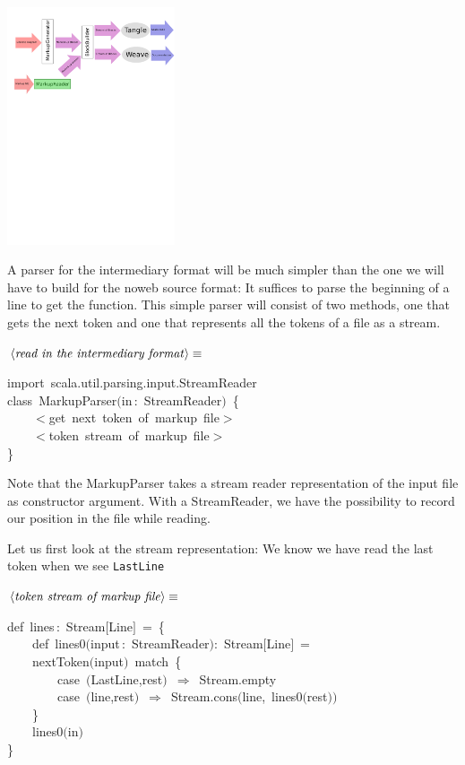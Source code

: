 \documentclass[a4paper,12pt]{article}
\begin{document}
\includegraphics[viewport=0 500 264 800,clip,height=7cm]{images/markupReader.pdf}

A parser for the intermediary format will be much simpler than the one
we will have to build for the noweb source format: It suffices to parse
the beginning of a line to get the function. This simple parser will
consist of two methods, one that gets the next token and one that
represents all the tokens of a file as a stream.

$\left<\mbox{\emph{read in the intermediary format}}\right>\equiv$
\begin{program}{\vem import}~scala.util.parsing.input.StreamReader
\\{\vem class}~MarkupParser$($in\,{\rm :}~StreamReader$)$~{\small\{}
\\~~~~$<$get~next~token~of~markup~file$>$
\\~~~~$<$token~stream~of~markup~file$>$
\\{\small\}}
\\[0.5em]\end{program}



Note that the MarkupParser takes a stream reader representation of
the input file as constructor argument. With a StreamReader, we have
the possibility to record our position in the file while reading.

Let us first look at the stream representation: We know we have read the
last token when we see \texttt{LastLine}

$\left<\mbox{\emph{token stream of markup file}}\right>\equiv$
\begin{program}{\vem def}~lines\,{\rm :}~Stream$[$Line$]$~=~{\small\{}
\\~~~~{\vem def}~lines0$($input\,{\rm :}~StreamReader$)${\rm :}~Stream$[$Line$]$~=
\\~~~~nextToken$($input$)$~{\vem match}~{\small\{}
\\~~~~~~~~{\vem case}~$($LastLine,rest$)$~$\Rightarrow$~Stream.empty
\\~~~~~~~~{\vem case}~$($line,rest$)$~$\Rightarrow$~Stream.cons$($line,~lines0$($rest$)$$)$
\\~~~~{\small\}}
\\~~~~lines0$($in$)$
\\{\small\}}
\\[0.5em]\end{program}
\end{document}
